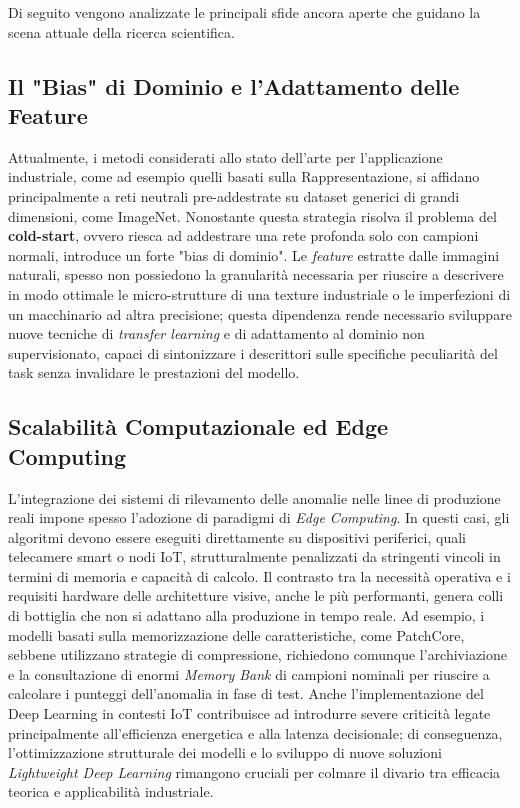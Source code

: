 Di seguito vengono analizzate le principali sfide ancora aperte che guidano la scena attuale della ricerca scientifica.

\subsection{Il "Bias" di Dominio e l'Adattamento delle Feature}
Attualmente, i metodi considerati allo stato dell'arte per l'applicazione industriale, come ad esempio quelli basati sulla Rappresentazione, si affidano principalmente a reti neutrali pre-addestrate su dataset generici di grandi dimensioni, come ImageNet.\cite{Roth_et_al._2022}
Nonostante questa strategia risolva il problema del \textbf{cold-start}, ovvero riesca ad addestrare una rete profonda solo con campioni normali, introduce un forte "bias di dominio".\cite{Li_et_al._2025}
Le \textit{feature} estratte dalle immagini naturali, spesso non possiedono la granularità necessaria per riuscire a descrivere in modo ottimale le micro-strutture di una texture industriale o le imperfezioni di un macchinario ad altra precisione; questa dipendenza rende necessario sviluppare nuove tecniche di \textit{transfer learning} e di adattamento al dominio non supervisionato, capaci di sintonizzare i descrittori sulle specifiche peculiarità del task senza invalidare le prestazioni del modello.\cite{Li_et_al._2025}


\subsection{Scalabilità Computazionale ed Edge Computing}
L'integrazione dei sistemi di rilevamento delle anomalie nelle linee di produzione reali impone spesso l'adozione di paradigmi di \textit{Edge Computing}. In questi casi, gli algoritmi devono essere eseguiti direttamente su dispositivi periferici, quali telecamere smart o nodi IoT, strutturalmente penalizzati da stringenti vincoli in termini di memoria e capacità di calcolo. \cite{Morshedi_et_al._2025}
Il contrasto tra la necessità operativa e i requisiti hardware delle architetture visive, anche le più performanti, genera colli di bottiglia che non si adattano alla produzione in tempo reale. Ad esempio, i modelli basati sulla memorizzazione delle caratteristiche, come PatchCore, sebbene utilizzano strategie di compressione, richiedono comunque l'archiviazione e la consultazione di enormi \textit{Memory Bank} di campioni nominali per riuscire a calcolare i punteggi dell'anomalia in fase di test.\cite{Roth_et_al._2022}
Anche l'implementazione del Deep Learning in contesti IoT contribuisce ad introdurre severe criticità legate principalmente all'efficienza energetica e alla latenza decisionale; di conseguenza, l'ottimizzazione strutturale dei modelli e lo sviluppo di nuove soluzioni \textit{Lightweight Deep Learning} rimangono cruciali per colmare il divario tra efficacia teorica e applicabilità industriale.\cite{Morshedi_et_al._2025}

